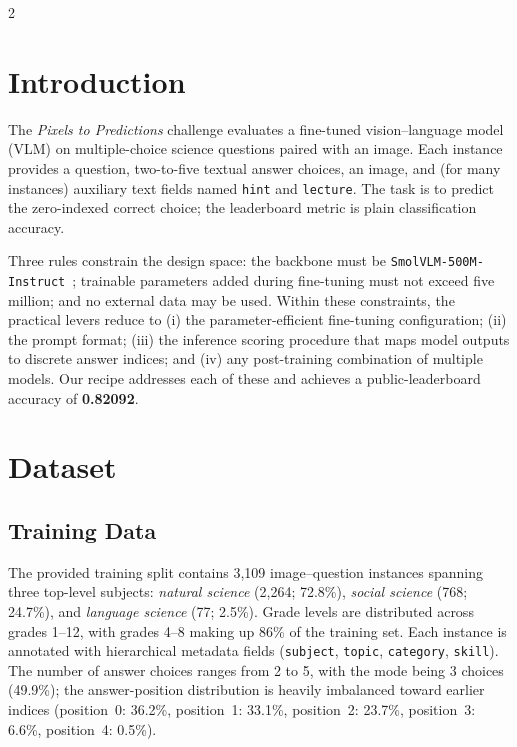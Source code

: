 \documentclass[11pt,a4paper]{article}
\begin{document}
\begin{multicols}{2}

\section{Introduction}

The \emph{Pixels to Predictions} challenge evaluates a fine-tuned vision--language model (VLM) on multiple-choice science questions paired with an image. Each instance provides a question, two-to-five textual answer choices, an image, and (for many instances) auxiliary text fields named \texttt{hint} and \texttt{lecture}. The task is to predict the zero-indexed correct choice; the leaderboard metric is plain classification accuracy.

Three rules constrain the design space: the backbone must be \texttt{SmolVLM-500M-Instruct}~\cite{marafioti2025smolvlm}; trainable parameters added during fine-tuning must not exceed five million; and no external data may be used. Within these constraints, the practical levers reduce to (i) the parameter-efficient fine-tuning configuration; (ii) the prompt format; (iii) the inference scoring procedure that maps model outputs to discrete answer indices; and (iv) any post-training combination of multiple models. Our recipe addresses each of these and achieves a public-leaderboard accuracy of \textbf{0.82092}.

\section{Dataset}

\subsection{Training Data}

The provided training split contains 3{,}109 image--question instances spanning three top-level subjects: \emph{natural science} (2{,}264; 72.8\%), \emph{social science} (768; 24.7\%), and \emph{language science} (77; 2.5\%). Grade levels are distributed across grades 1--12, with grades 4--8 making up 86\% of the training set. Each instance is annotated with hierarchical metadata fields (\texttt{subject}, \texttt{topic}, \texttt{category}, \texttt{skill}). The number of answer choices ranges from 2 to 5, with the mode being 3 choices (49.9\%); the answer-position distribution is heavily imbalanced toward earlier indices (position~0: 36.2\%, position~1: 33.1\%, position~2: 23.7\%, position~3: 6.6\%, position~4: 0.5\%).


\end{multicols}
\end{document}
